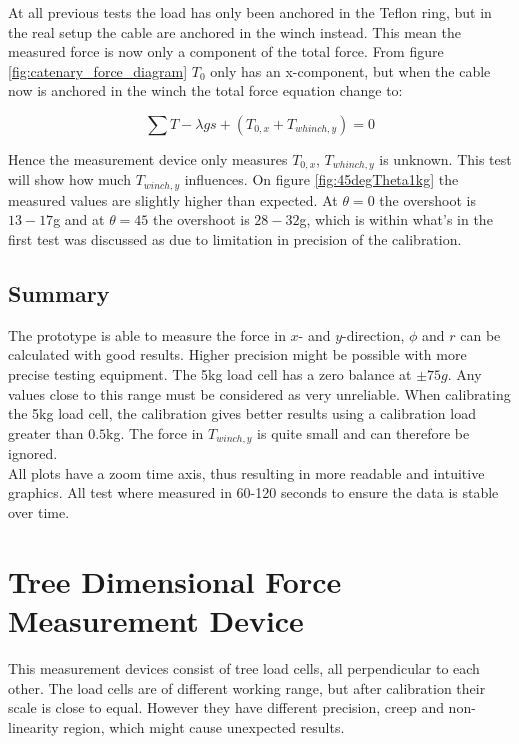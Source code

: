 \noindent
At all previous tests the load has only been anchored in the Teflon ring, but in the real setup the cable are anchored in the winch instead. This mean the measured force is now only a component of the total force. From figure \ref{fig:catenary_force_diagram} $T_0$ only has an x-component, but when the cable now is anchored in the winch the total force equation change to:

\begin{equation}
\sum T -\lambda gs + (T_{0,x} + T_{whinch,y} ) = 0
\end{equation}

\noindent
Hence the measurement device only measures $T_{0,x}$, $T_{whinch,y}$ is unknown. This test will show how much $T_{winch,y}$ influences.
On figure \ref{fig:45degTheta1kg} the measured values are slightly higher than expected. At $\theta = 0$ the overshoot is $13-17$g and at $\theta = 45$ the overshoot is $28-32$g, which is within what's in the first test was discussed as due to limitation in precision of the calibration. 



\newpage
\subsection{Summary}
The prototype is able to measure the force in $x$- and $y$-direction, $\phi$ and $r$ can be calculated with good results. Higher precision might be possible with more precise testing equipment.
The 5kg load cell has a zero balance at $\pm75g$. Any values close to this range must be considered as very unreliable. 
When calibrating the 5kg load cell, the calibration gives better results using a calibration load greater than $0.5$kg.
The force in $T_{winch,y}$ is quite small and can therefore be ignored.\\
All plots have a zoom time axis, thus resulting in more readable and intuitive graphics. All test where measured in 60-120 seconds to ensure the data is stable over time.

\newpage
\section{Tree Dimensional Force Measurement Device}
This measurement devices consist of tree load cells, all perpendicular to each other. The load cells are of different working range, but after calibration their scale is close to equal. However they have different precision, creep and non-linearity region, which might cause unexpected results.

